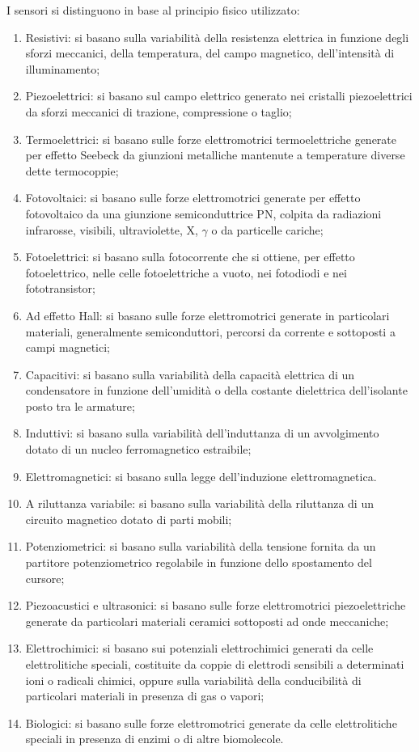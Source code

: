 \documentclass[a4paper,12pt]{article}
\begin{document}
I sensori si distinguono in base al principio fisico utilizzato:
\begin{enumerate}
\item Resistivi: si basano sulla variabilità della resistenza elettrica in funzione degli sforzi meccanici, della temperatura, del campo magnetico, dell'intensità di illuminamento;
\item Piezoelettrici: si basano sul campo elettrico generato nei cristalli piezoelettrici da sforzi meccanici di trazione, compressione o taglio;
\item Termoelettrici: si basano sulle forze elettromotrici termoelettriche generate per effetto Seebeck da giunzioni metalliche mantenute a temperature diverse dette termocoppie;
\item Fotovoltaici: si basano sulle forze elettromotrici generate per effetto fotovoltaico da una giunzione semiconduttrice PN, colpita da radiazioni infrarosse, visibili, ultraviolette, X,        $ \gamma $ o da particelle cariche;
\item Fotoelettrici: si basano sulla fotocorrente che si ottiene, per effetto fotoelettrico, nelle celle fotoelettriche a vuoto, nei fotodiodi e nei fototransistor;
\item Ad effetto Hall: si basano sulle forze elettromotrici generate in particolari materiali, generalmente semiconduttori, percorsi da corrente e sottoposti a campi magnetici;
\item Capacitivi: si basano sulla variabilità della capacità elettrica di un condensatore in funzione dell'umidità o della costante dielettrica dell'isolante posto tra le armature;
\item Induttivi: si basano sulla variabilità dell'induttanza di un avvolgimento dotato di un nucleo ferromagnetico estraibile;
\item Elettromagnetici: si basano sulla legge dell'induzione elettromagnetica.
\item A riluttanza variabile: si basano sulla variabilità della riluttanza di un circuito magnetico dotato di parti mobili;
\item Potenziometrici: si basano sulla variabilità della tensione fornita da un partitore potenziometrico regolabile in funzione dello spostamento del cursore;
\item Piezoacustici e ultrasonici: si basano sulle forze elettromotrici piezoelettriche generate da particolari materiali ceramici sottoposti ad onde meccaniche;
\item Elettrochimici: si basano sui potenziali elettrochimici generati da celle elettrolitiche speciali, costituite da coppie di elettrodi sensibili a determinati ioni o radicali chimici, oppure sulla variabilità della conducibilità di particolari materiali in presenza di gas o vapori;
\item Biologici: si basano sulle forze elettromotrici generate da celle elettrolitiche speciali in presenza di enzimi o di altre biomolecole.
\end{enumerate}
\end{document}
